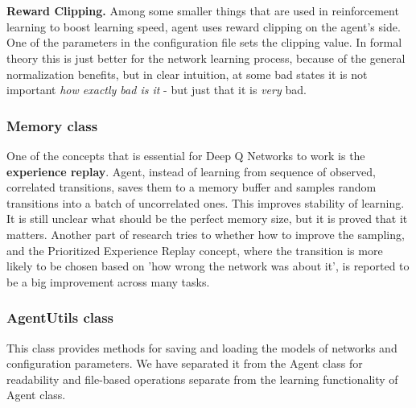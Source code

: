 \documentclass{article}
\begin{document}
\\\\
\textbf{Reward Clipping.} Among some smaller things that are used in reinforcement learning to boost learning speed, agent uses reward clipping on the agent's side. One of the parameters in the configuration file sets the clipping value. In formal theory this is just better for the network learning process, because of the general normalization benefits, but in clear intuition, at some bad states it is not important \textit{how exactly bad is it} - but just that it is \textit{very} bad.

\subsubsection{Memory class}
One of the concepts that is essential for Deep Q Networks to work is the \textbf{experience replay}. Agent, instead of learning from sequence of observed, correlated transitions, saves them to a memory buffer and samples random transitions into a batch of uncorrelated ones. This improves stability of learning. It is still unclear what should be the perfect memory size, but it is proved that it matters. Another part of research tries to whether how to improve the sampling, and the Prioritized Experience Replay concept, where the transition is more likely to be chosen based on 'how wrong the network was about it', is reported to be a big improvement across many tasks.


\subsubsection{AgentUtils class}
This class provides methods for saving and loading the models of networks and configuration parameters. We have separated it from the Agent class for readability and file-based operations separate from the learning functionality of Agent class.
\end{document}
